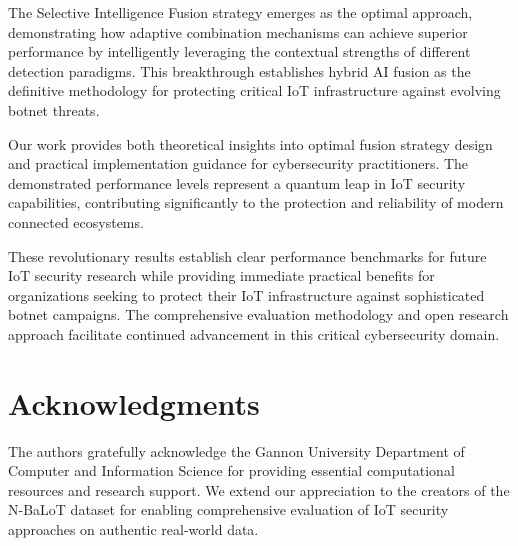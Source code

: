 \documentclass[conference]{IEEEtran}
\begin{document}
The Selective Intelligence Fusion strategy emerges as the optimal approach, demonstrating how adaptive combination mechanisms can achieve superior performance by intelligently leveraging the contextual strengths of different detection paradigms. This breakthrough establishes hybrid AI fusion as the definitive methodology for protecting critical IoT infrastructure against evolving botnet threats.

Our work provides both theoretical insights into optimal fusion strategy design and practical implementation guidance for cybersecurity practitioners. The demonstrated performance levels represent a quantum leap in IoT security capabilities, contributing significantly to the protection and reliability of modern connected ecosystems.

These revolutionary results establish clear performance benchmarks for future IoT security research while providing immediate practical benefits for organizations seeking to protect their IoT infrastructure against sophisticated botnet campaigns. The comprehensive evaluation methodology and open research approach facilitate continued advancement in this critical cybersecurity domain.

\section*{Acknowledgments}

The authors gratefully acknowledge the Gannon University Department of Computer and Information Science for providing essential computational resources and research support. We extend our appreciation to the creators of the N-BaLoT dataset for enabling comprehensive evaluation of IoT security approaches on authentic real-world data.
\end{document}
